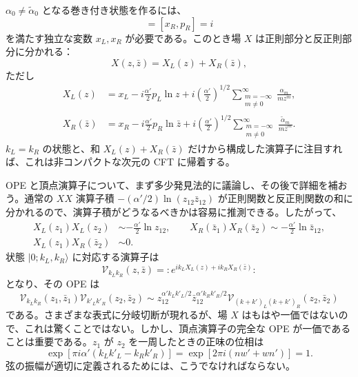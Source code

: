 
$\alpha_0\ne\widetilde\alpha_0$ となる巻き付き状態を作るには、
\begin{equation}
[x_L,p_L]=[x_R,p_R]=i
\tag{8.2.14}\label{eq:8.2.14}
\end{equation}
を満たす独立な変数 $x_L,x_R$ が必要である。このとき場 $X$ は正則部分と反正則部分に分かれる：
\begin{equation}
X(z,\bar z)=X_L(z)+X_R(\bar z),
\tag{8.2.15}\label{eq:8.2.15}
\end{equation}
ただし
\begin{align}
X_L(z)&=x_L-i\frac{\alpha'}2p_L\ln z
+i\left(\frac{\alpha'}2\right)^{1/2}\sum_{\substack{m=-\infty\\m\ne0}}^{\infty}\frac{\alpha_m}{mz^m},
\tag{8.2.16a}\label{eq:8.2.16a}\\
X_R(\bar z)&=x_R-i\frac{\alpha'}2p_R\ln\bar z
+i\left(\frac{\alpha'}2\right)^{1/2}\sum_{\substack{m=-\infty\\m\ne0}}^{\infty}\frac{\widetilde\alpha_m}{m\bar z^m}.
\tag{8.2.16b}\label{eq:8.2.16b}
\end{align}
$k_L=k_R$ の状態と、和 $X_L(z)+X_R(\bar z)$ だけから構成した演算子に注目すれば、これは非コンパクトな次元の CFT に帰着する。

OPE と頂点演算子について、まず多少発見法的に議論し、その後で詳細を補おう。通常の $XX$ 演算子積 $-(\alpha'/2)\ln(z_{12}\bar z_{12})$ が正則関数と反正則関数の和に分かれるので、演算子積がどうなるべきかは容易に推測できる。したがって、
\begin{align}
X_L(z_1)X_L(z_2)&\sim-\frac{\alpha'}2\ln z_{12},\qquad
X_R(\bar z_1)X_R(\bar z_2)\sim-\frac{\alpha'}2\ln\bar z_{12},
\tag{8.2.17a}\label{eq:8.2.17a}\\
X_L(z_1)X_R(\bar z_2)&\sim0.
\tag{8.2.17b}\label{eq:8.2.17b}
\end{align}
状態 $\lvert0;k_L,k_R\rangle$ に対応する演算子は
\begin{equation}
\mathcal V_{k_Lk_R}(z,\bar z)=:e^{ik_LX_L(z)+ik_RX_R(\bar z)}:
\tag{8.2.18}\label{eq:8.2.18}
\end{equation}
となり、その OPE は
\begin{equation}
\mathcal V_{k_Lk_R}(z_1,\bar z_1)\mathcal V_{k'_Lk'_R}(z_2,\bar z_2)
\sim z_{12}^{\alpha'k_Lk'_L/2}\bar z_{12}^{\alpha'k_Rk'_R/2}
\mathcal V_{(k+k')_L(k+k')_R}(z_2,\bar z_2)
\tag{8.2.19}\label{eq:8.2.19}
\end{equation}
である。さまざまな表式に分岐切断が現れるが、場 $X$ はもはや一価ではないので、これは驚くことではない。しかし、頂点演算子の完全な OPE が一価であることは重要である。$z_1$ が $z_2$ を一周したときの正味の位相は
\begin{equation}
\exp[\pi i\alpha'(k_Lk'_L-k_Rk'_R)]
=\exp[2\pi i(nw'+wn')]=1.
\tag{8.2.20}\label{eq:8.2.20}
\end{equation}
弦の振幅が適切に定義されるためには、こうでなければならない。

